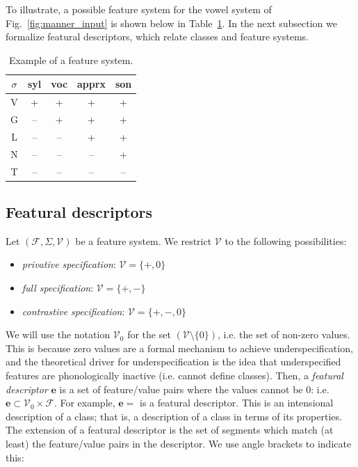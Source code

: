\documentclass[11pt, oneside]{article}   	%
\begin{document}
\noindent To illustrate, a possible feature system for the vowel system of Fig.~\ref{fig:manner_input} is shown below in Table~\ref{table:featurization}. In the next subsection we formalize featural descriptors, which relate classes and feature systems.

\begin{table}[h]
    \centering
    \begin{tabular} {|c||c|c|c|c|}
    \hline
        $\sigma$ & syl & voc & apprx & son \\ \hline
        V & + & + & + & + \\
        G & -- & + & + & + \\
        L & -- & -- & + & + \\
        N & -- & -- & -- & + \\
        T & -- & -- & -- & -- \\
        \hline
    \end{tabular}
    \caption{Example of a feature system.}
    \label{table:featurization}
\end{table}

\subsection{Featural descriptors}

Let $(\mathcal F, \Sigma, \mathcal V)$ be a feature system. We restrict $\mathcal V$ to the following possibilities: \begin{itemize}
    \item \textit{privative specification}: $\mathcal V = \{ +, 0 \}$
    \item \textit{full specification}: $\mathcal V = \{ +, - \}$
    \item \textit{contrastive specification}: $\mathcal V = \{ +, -, 0 \}$
    \end{itemize}

\noindent We will use the notation $\mathcal V_0$ for the set $(\mathcal V \setminus \{0\})$, i.e. the set of non-zero values. This is because zero values are a formal mechanism to achieve underspecification, and the theoretical driver for underspecification is the idea that underspecified features are phonologically inactive (i.e. cannot define classes). Then, a \textit{featural descriptor} $\mathbf{e}$ is a set of feature/value pairs where the values cannot be $0$: i.e. $\mathbf{e} \subset \mathcal V_0 \times \mathcal F$. For example, $\mathbf{e} =$   is a featural descriptor. This is an intensional description of a class; that is, a description of a class in terms of its properties. The extension of a featural descriptor is the set of segments which match (at least) the feature/value pairs in the descriptor. We use angle brackets to indicate this:
\end{document}
